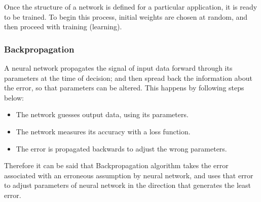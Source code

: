\vspace{5mm} %

Once the structure of a network is defined for a particular application, it is ready to be trained. To begin this process, initial weights are chosen at random, and then proceed with training (learning).

\subsubsection{Backpropagation}

A neural network propagates the signal of input data forward through its parameters at the time of decision; and then spread back the information about the error, so that parameters can be altered. This happens by following steps below:

\begin{itemize}
\item The network guesses output data, using its parameters.
\item The network measures its accuracy with a loss function.
\item The error is propagated backwards to adjust the wrong parameters.
\end{itemize}

Therefore it can be said that Backpropagation algorithm takes the error associated with an erroneous assumption by neural network, and uses that error to adjust parameters of neural network in the direction that generates the least error.

